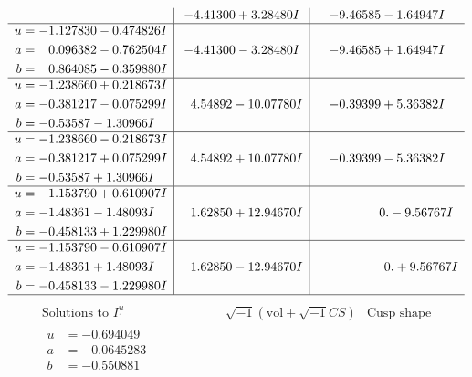 \documentclass[1p]{elsarticle_modified}
\theoremstyle{definition}
\newcommand{\I}{\sqrt{-1}}
\begin{document}
$$\begin{array}{c|c|c}
 & -4.41300 + 3.28480 I & -9.46585 - 1.64947 I \\ \hline\begin{aligned}
u &= -1.127830 - 0.474826 I \\
a &= \phantom{-}0.096382 - 0.762504 I \\
b &= \phantom{-}0.864085 - 0.359880 I\end{aligned}
 & -4.41300 - 3.28480 I & -9.46585 + 1.64947 I \\ \hline\begin{aligned}
u &= -1.238660 + 0.218673 I \\
a &= -0.381217 - 0.075299 I \\
b &= -0.53587 - 1.30966 I\end{aligned}
 & \phantom{-}4.54892 - 10.07780 I & -0.39399 + 5.36382 I \\ \hline\begin{aligned}
u &= -1.238660 - 0.218673 I \\
a &= -0.381217 + 0.075299 I \\
b &= -0.53587 + 1.30966 I\end{aligned}
 & \phantom{-}4.54892 + 10.07780 I & -0.39399 - 5.36382 I \\ \hline\begin{aligned}
u &= -1.153790 + 0.610907 I \\
a &= -1.48361 - 1.48093 I \\
b &= -0.458133 + 1.229980 I\end{aligned}
 & \phantom{-}1.62850 + 12.94670 I & \phantom{-0.000000 } 0. - 9.56767 I \\ \hline\begin{aligned}
u &= -1.153790 - 0.610907 I \\
a &= -1.48361 + 1.48093 I \\
b &= -0.458133 - 1.229980 I\end{aligned}
 & \phantom{-}1.62850 - 12.94670 I & \phantom{-0.000000 -}0. + 9.56767 I\\
 \hline 
 \end{array}$$\newpage$$\begin{array}{c|c|c}  
\text{Solutions to }I^u_{1}& \I (\text{vol} + \sqrt{-1}CS) & \text{Cusp shape}\\
 \hline 
\begin{aligned}
u &= -0.694049\phantom{ +0.000000I} \\
a &= -0.0645283\phantom{ +0.000000I} \\
b &= -0.550881\phantom{ +0.000000I}\end{aligned}

\end{array}$$
\end{document}
